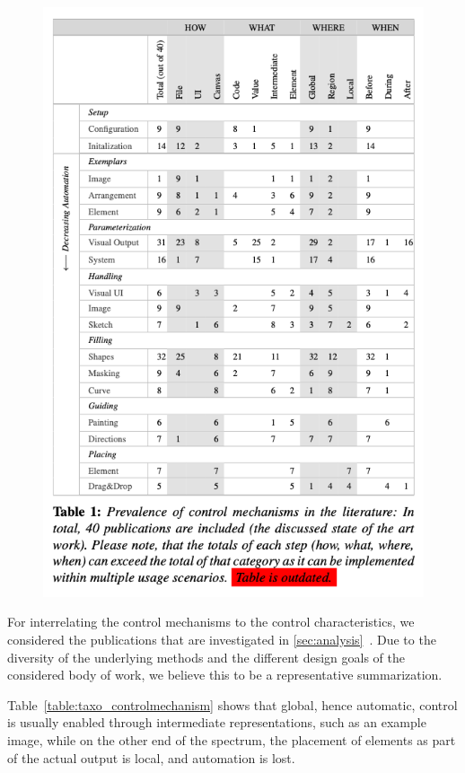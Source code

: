 \begin{figure}
    \centering
    \includegraphics[width=\linewidth]{tables/table_controlmechanism.png}
\end{figure}



For interrelating the control mechanisms to the control characteristics, we considered the publications that are investigated in \cref{sec:analysis}~. Due to the diversity of the underlying methods and the different design goals of the considered body of work, we believe this to be a representative summarization.


Table~\ref{table:taxo_controlmechanism} shows that global, hence automatic, control is usually enabled through intermediate representations, such as an example image, while on the other end of the spectrum, the placement of elements as part of the actual output is local, and automation is lost.

